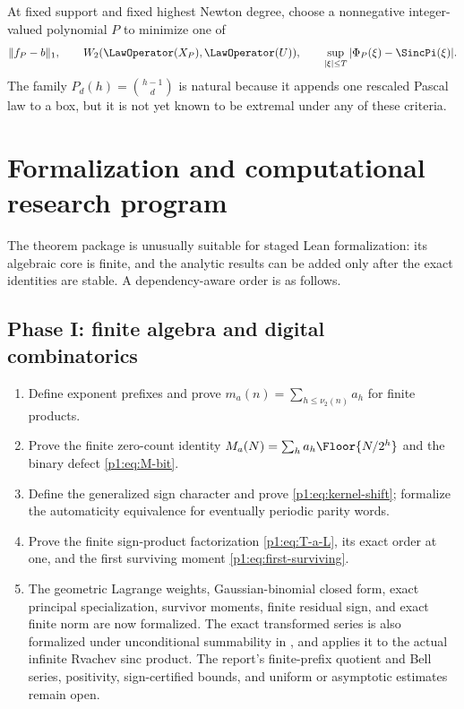 \documentclass[11pt,oneside]{article}
\numberwithin{equation}{section}
\theoremstyle{definition}
\theoremstyle{remark}
\begin{document}
\begin{problem}
At fixed support and fixed highest Newton degree, choose a nonnegative integer-valued
polynomial $P$ to minimize one of
\[
 \|f_P-b\|_1,
 \qquad
 W_2(\LawOperator(X_P),\LawOperator(U)),
 \qquad
 \sup_{|\xi|\le T}|\Phi_P(\xi)-\SincPi(\xi)|.
\]
The family $P_d(h)=\binom{h-1}{d}$ is natural because it appends one rescaled Pascal law to a
box, but it is not yet known to be extremal under any of these criteria.
\end{problem}


\section{Formalization and computational research program}
\label{p1:sec:formalization}

The theorem package is unusually suitable for staged Lean formalization: its algebraic core
is finite, and the analytic results can be added only after the exact identities are stable.
A dependency-aware order is as follows.

\subsection{Phase I: finite algebra and digital combinatorics}

\begin{enumerate}
\item Define exponent prefixes and prove
      $m_a(n)=\sum_{h\le\nu_2(n)}a_h$ for finite products.
\item Prove the finite zero-count identity
      $M_a(N)=\sum_ha_h\Floor{N/2^h}$ and the binary defect
      \eqref{p1:eq:M-bit}.
\item Define the generalized sign character and prove
      \eqref{p1:eq:kernel-shift}; formalize the automaticity equivalence for eventually
      periodic parity words.
\item Prove the finite sign-product factorization \eqref{p1:eq:T-a-L}, its exact order at one,
      and the first surviving moment \eqref{p1:eq:first-surviving}.
\item The geometric Lagrange weights, Gaussian-binomial closed form, exact
      principal specialization, survivor moments, finite residual sign, and exact finite
      norm are now formalized.  The exact transformed series is also formalized under
      unconditional summability in , and
       applies it to the actual infinite Rvachev
      sinc product.  The report's finite-prefix quotient and Bell series, positivity,
      sign-certified bounds, and uniform or asymptotic estimates remain open.
\end{enumerate}
\end{document}
